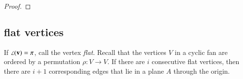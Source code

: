 \begin{proof}
\end{proof}




%
%


%
%

\subsection{flat vertices}


If $\angle({\mathbf v})=\pi$, call the vertex {\it flat}. Recall that the vertices $V$ in a cyclic fan are ordered by a permutation $\rho:V\to V$.  If there are $i$ consecutive flat vertices, then there are  $i+1$ corresponding edges that lie in a plane $A$ through the origin.  
%
%

